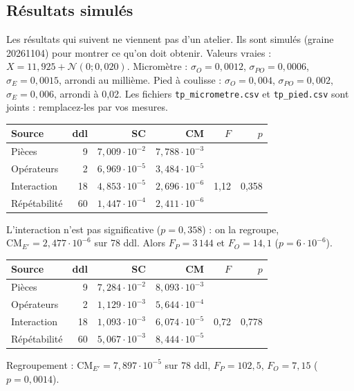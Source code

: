 \documentclass[11pt,a4paper]{article}
\theoremstyle{sj}
\theoremstyle{definition}
\theoremstyle{remark}
\newcommand{\N}{\mathcal{N}}
\newcommand{\CM}{\mathrm{CM}}
\begin{document}
\subsection{Résultats simulés}

\begin{attention}
Les résultats qui suivent ne viennent pas d'un atelier. Ils sont simulés (graine 20261104) pour montrer ce qu'on doit obtenir. Valeurs vraies : $X=11{,}925+\N(0;0{,}020)$. Micromètre : $\sigma_O=0{,}0012$, $\sigma_{PO}=0{,}0006$, $\sigma_E=0{,}0015$, arrondi au millième. Pied à coulisse : $\sigma_O=0{,}004$, $\sigma_{PO}=0{,}002$, $\sigma_E=0{,}006$, arrondi à 0,02. Les fichiers \texttt{tp\_micrometre.csv} et \texttt{tp\_pied.csv} sont joints : remplacez-les par vos mesures.
\end{attention}

\begin{center}
\begin{tabular}{l r r r r r}
\toprule
Source & ddl & SC & CM & $F$ & $p$\\
\midrule
Pièces & 9 & $7{,}009\cdot10^{-2}$ & $7{,}788\cdot10^{-3}$ & &\\
Opérateurs & 2 & $6{,}969\cdot10^{-5}$ & $3{,}484\cdot10^{-5}$ & &\\
Interaction & 18 & $4{,}853\cdot10^{-5}$ & $2{,}696\cdot10^{-6}$ & 1,12 & 0,358\\
Répétabilité & 60 & $1{,}447\cdot10^{-4}$ & $2{,}411\cdot10^{-6}$ & &\\
\bottomrule
\end{tabular}
\end{center}
L'interaction n'est pas significative ($p=0{,}358$) : on la regroupe, $\CM_{E'}=2{,}477\cdot10^{-6}$ sur 78 ddl. Alors $F_P=3\,144$ et $F_O=14{,}1$ ($p=6\cdot10^{-6}$).

\begin{center}
\begin{tabular}{l r r r r r}
\toprule
Source & ddl & SC & CM & $F$ & $p$\\
\midrule
Pièces & 9 & $7{,}284\cdot10^{-2}$ & $8{,}093\cdot10^{-3}$ & &\\
Opérateurs & 2 & $1{,}129\cdot10^{-3}$ & $5{,}644\cdot10^{-4}$ & &\\
Interaction & 18 & $1{,}093\cdot10^{-3}$ & $6{,}074\cdot10^{-5}$ & 0,72 & 0,778\\
Répétabilité & 60 & $5{,}067\cdot10^{-3}$ & $8{,}444\cdot10^{-5}$ & &\\
\bottomrule
\end{tabular}
\end{center}
Regroupement : $\CM_{E'}=7{,}897\cdot10^{-5}$ sur 78 ddl, $F_P=102{,}5$, $F_O=7{,}15$ ($p=0{,}0014$).
\end{document}
